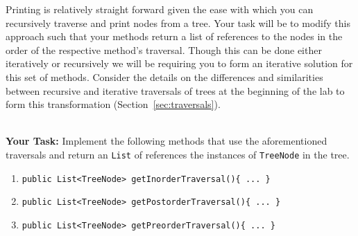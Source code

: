 Printing is relatively straight forward given the ease with which you can
recursively traverse and print nodes from a tree. Your task will be to modify
this approach such that your methods return a list of references to the nodes
in the order of the respective method's traversal. Though this can be done either
iteratively or recursively we will be requiring you to form an iterative solution 
for this set of methods. Consider the details on the differences and similarities
between recursive and iterative traversals of trees at the beginning of the lab
to form this transformation (Section~\ref{sec:traversals}).

\vspace{0.5cm}\\
\textbf{Your Task: } Implement the following methods that use the
aforementioned traversals and return an \lstinline|List| of
references the instances of \lstinline|TreeNode| in the tree.
\begin{enumerate}
    \item \lstinline|public List<TreeNode> getInorderTraversal(){ ... }|
    \item \lstinline|public List<TreeNode> getPostorderTraversal(){ ... }|
    \item \lstinline|public List<TreeNode> getPreorderTraversal(){ ... }|
\end{enumerate}


